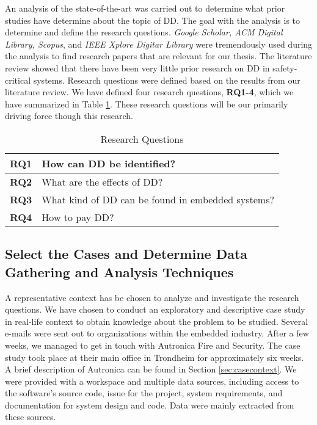 An analysis of the state-of-the-art was carried out to determine what prior studies have determine about the topic of DD. The goal with the analysis is to determine and define the research questions. \textit{Google Scholar, ACM Digital Library, Scopus}, and \textit{IEEE Xplore Digitar Library} were tremendously used during the analysis to find research papers that are relevant for our thesis. The literature review showed that there have been very little prior research on DD in safety-critical systems. Research questions were defined based on the results from our literature review. We have defined four research questions, \textbf{RQ1-4}, which we have summarized in Table \ref{researchQuestionsChapter3}. These research questions will be our primarily driving force though this research.

\begin{table}[]
	\centering
	\caption{Research Questions}
	\label{researchQuestionsChapter3}
	\begin{tabular}{|l|p{8cm}|}
		\hline
		\textbf{RQ1} & How can DD be identified?     \\ \hline
		\textbf{RQ2} & What are the effects of DD?  \\ \hline
		\textbf{RQ3} & What kind of DD can be found in embedded systems? \\ \hline
		\textbf{RQ4} & How to pay DD? \\ \hline
	\end{tabular}
\end{table}



\subsection{Select the Cases and Determine Data Gathering and Analysis Techniques} %
A representative context has be chosen to analyze and investigate the research questions. We have chosen to conduct an exploratory and descriptive case study in real-life context to obtain knowledge about the problem to be studied. Several e-mails were sent out to organizations within the embedded industry. After a few weeks, we managed to get in touch with Autronica Fire and Security. The case study took place at their main office in Trondheim for approximately six weeks. A brief description of Autronica can be found in Section \ref{sec:casecontext}. We were provided with a workspace and multiple data sources, including access to the software's source code, issue for the project, system requirements, and documentation for system design and code. Data were mainly extracted from these sources. 

